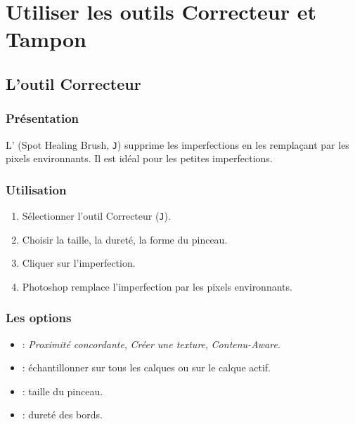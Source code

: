 \section{Utiliser les outils Correcteur et Tampon}

\subsection{L'outil Correcteur}

\subsubsection{Présentation}

L' (Spot Healing Brush, \texttt{J}) supprime les imperfections en les remplaçant par les pixels environnants. Il est idéal pour les petites imperfections.

\subsubsection{Utilisation}

\begin{enumerate}
    \item Sélectionner l'outil Correcteur (\texttt{J}).
    \item Choisir la taille, la dureté, la forme du pinceau.
    \item Cliquer sur l'imperfection.
    \item Photoshop remplace l'imperfection par les pixels environnants.
\end{enumerate}

\subsubsection{Les options}

\begin{itemize}
    \item {} : \emph{Proximité concordante}, \emph{Créer une texture}, \emph{Contenu-Aware}.
    \item {} : échantillonner sur tous les calques ou sur le calque actif.
    \item {} : taille du pinceau.
    \item {} : dureté des bords.
\end{itemize}

